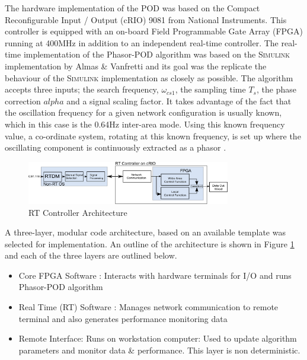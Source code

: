 \documentclass[journal]{IEEEtran}
\begin{document}
The hardware implementation of the POD was based on the Compact Reconfigurable Input / Output (cRIO) 9081 \cite{cRIO9081} from National Instruments. This controller is equipped with an on-board Field Programmable Gate Array (FPGA) running at 400MHz in addition to an independent real-time controller. The real-time implementation of the Phasor-POD algorithm was based on the \textsc{Simulink} implementation by Almas \& Vanfretti \cite{PhasorPODImplement} and its goal was the replicate the behaviour of the \textsc{Simulink} implementation as closely as possible. The algorithm accepts three inputs; the search frequency, $\omega_{cs1}$, the sampling time $T_{s}$, the phase correction $alpha$ and a signal scaling factor. It takes advantage of the fact that the oscillation frequency for a given network configuration is usually known, which in this case is the 0.64Hz inter-area mode. Using this known frequency value, a  co-ordinate system, rotating at this known frequency, is set up where the oscillating component is continuously extracted as a phasor \cite{PhasorPOD}.\\
\begin{figure}[!t]
\centering
\includegraphics[width=3.5in]{Final_RT_Arch.png} 
\caption{RT Controller Architecture} %
\label{RTArchitecture}
\end{figure}

A three-layer, modular code architecture, based on an available template \cite{LabviewTemplate} was selected for implementation. An outline of the architecture is shown in Figure \ref{RTArchitecture} and each of the three layers are outlined below. 

\begin{itemize}
\item Core FPGA Software : Interacts with hardware terminals for I/O and runs Phasor-POD algorithm

\item Real Time (RT) Software : Manages network communication to remote terminal and also generates performance monitoring data

\item Remote Interface: Runs on workstation computer: Used to update algorithm parameters and monitor data \& performance. This layer is non deterministic.
\end{itemize}
\end{document}
